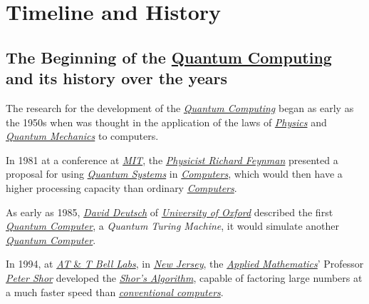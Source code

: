 \documentclass[conference]{IEEEtran}
\begin{document}
\vspace{6pt}

\section{Timeline and History}

\subsection{The Beginning of the \href{https://en.wikipedia.org/wiki/Quantum_computing}{Quantum Computing} and its history over the years}\label{AA}

The research for the development of the \href{https://en.wikipedia.org/wiki/Quantum_computing}{\textit{Quantum Computing}} began as early as the 1950s when was thought in the application of the laws of \href{https://en.wikipedia.org/wiki/Physics}{\textit{Physics}} and \href{https://en.wikipedia.org/wiki/Quantum_mechanics}{\textit{Quantum Mechanics}} to computers.

\newpage

In 1981 at a conference at \href{https://en.wikipedia.org/wiki/Massachusetts_Institute_of_Technology}{\textit{MIT}}, the \href{https://en.wikipedia.org/wiki/Richard_Feynman}{\textit{Physicist Richard Feynman}} presented a proposal for using \href{https://en.wikipedia.org/wiki/Quantum_system}{\textit{Quantum Systems}} in \href{https://en.wikipedia.org/wiki/Computer}{\textit{Computers}}, which would then have a higher processing capacity than ordinary \href{https://en.wikipedia.org/wiki/Computer}{\textit{Computers}}.

\vspace{4pt}

As early as 1985, \href{https://en.wikipedia.org/wiki/David_Deutsch}{\textit{David Deutsch}} of \href{https://en.wikipedia.org/wiki/University_of_Oxford}{\textit{University of Oxford}} described the first \href{https://en.wikipedia.org/wiki/Quantum_computing}{\textit{Quantum Computer}}, a \textit{Quantum Turing Machine}, it would simulate another \href{https://en.wikipedia.org/wiki/Quantum_computing}{\textit{Quantum Computer}}.

\vspace{4pt}

In 1994, at \href{https://en.wikipedia.org/wiki/Bell_Labs}{\textit{AT} \& \textit{T Bell Labs}}, in \href{https://en.wikipedia.org/wiki/New_Jersey}{\textit{New Jersey}}, the \href{https://en.wikipedia.org/wiki/Applied_mathematics}{\textit{Applied Mathematics}}' Professor \href{https://en.wikipedia.org/wiki/Peter_Shor}{\textit{Peter Shor}} developed the \href{https://en.wikipedia.org/wiki/Shor\%27s_algorithm}{\textit{Shor's Algorithm}}, capable of factoring large numbers at a much faster speed than \href{https://en.wikipedia.org/wiki/Von_Neumann_architecture}{\textit{conventional computers}}.
\end{document}
